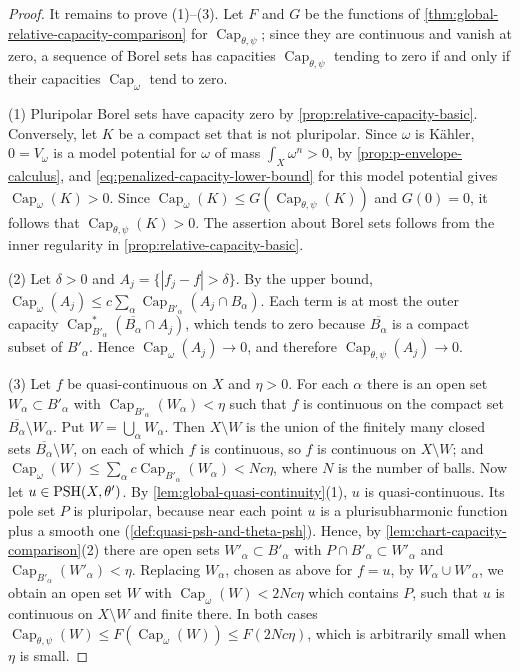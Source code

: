 \begin{proof}
It remains to prove (1)--(3). Let $F$ and $G$ be the functions of \cref{thm:global-relative-capacity-comparison} for $\operatorname{Cap}_{\theta,\psi}$; since they are continuous and vanish at zero, a sequence of Borel sets has capacities $\operatorname{Cap}_{\theta,\psi}$ tending to zero if and only if their capacities $\operatorname{Cap}_\omega$ tend to zero.

(1) Pluripolar Borel sets have capacity zero by \cref{prop:relative-capacity-basic}. Conversely, let $K$ be a compact set that is not pluripolar. Since $\omega$ is K\"ahler, $0=V_\omega$ is a model potential for $\omega$ of mass $\int_X\omega^n>0$, by \cref{prop:p-envelope-calculus}, and \eqref{eq:penalized-capacity-lower-bound} for this model potential gives $\operatorname{Cap}_\omega(K)>0$. Since $\operatorname{Cap}_\omega(K)\leq G(\operatorname{Cap}_{\theta,\psi}(K))$ and $G(0)=0$, it follows that $\operatorname{Cap}_{\theta,\psi}(K)>0$. The assertion about Borel sets follows from the inner regularity in \cref{prop:relative-capacity-basic}.

(2) Let $\delta>0$ and $A_j=\{|f_j-f|>\delta\}$. By the upper bound, $\operatorname{Cap}_\omega(A_j)\leq c\sum_\alpha\operatorname{Cap}_{B'_\alpha}(A_j\cap B_\alpha)$. Each term is at most the outer capacity $\operatorname{Cap}^*_{B'_\alpha}(\overline{B_\alpha}\cap A_j)$, which tends to zero because $\overline{B_\alpha}$ is a compact subset of $B'_\alpha$. Hence $\operatorname{Cap}_\omega(A_j)\to0$, and therefore $\operatorname{Cap}_{\theta,\psi}(A_j)\to0$.

(3) Let $f$ be quasi-continuous on $X$ and $\eta>0$. For each $\alpha$ there is an open set $W_\alpha\subset B'_\alpha$ with $\operatorname{Cap}_{B'_\alpha}(W_\alpha)<\eta$ such that $f$ is continuous on the compact set $\overline{B_\alpha}\setminus W_\alpha$. Put $W=\bigcup_\alpha W_\alpha$. Then $X\setminus W$ is the union of the finitely many closed sets $\overline{B_\alpha}\setminus W$, on each of which $f$ is continuous, so $f$ is continuous on $X\setminus W$; and $\operatorname{Cap}_\omega(W)\leq\sum_\alpha c\operatorname{Cap}_{B'_\alpha}(W_\alpha)<Nc\eta$, where $N$ is the number of balls. Now let $u\in\mathrm{PSH}(X,\theta')$. By \cref{lem:global-quasi-continuity}(1), $u$ is quasi-continuous. Its pole set $P$ is pluripolar, because near each point $u$ is a plurisubharmonic function plus a smooth one (\cref{def:quasi-psh-and-theta-psh}). Hence, by \cref{lem:chart-capacity-comparison}(2) there are open sets $W'_\alpha\subset B'_\alpha$ with $P\cap B'_\alpha\subset W'_\alpha$ and $\operatorname{Cap}_{B'_\alpha}(W'_\alpha)<\eta$. Replacing $W_\alpha$, chosen as above for $f=u$, by $W_\alpha\cup W'_\alpha$, we obtain an open set $W$ with $\operatorname{Cap}_\omega(W)<2Nc\eta$ which contains $P$, such that $u$ is continuous on $X\setminus W$ and finite there. In both cases $\operatorname{Cap}_{\theta,\psi}(W)\leq F(\operatorname{Cap}_\omega(W))\leq F(2Nc\eta)$, which is arbitrarily small when $\eta$ is small.
\end{proof}
